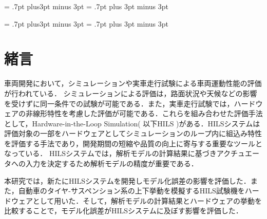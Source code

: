 \documentclass{article_vdlab_sotsuron_youshi}
\begin{document}
\kanjiskip = .7pt plus3pt minus 3pt
\xkanjiskip = .7pt plus 3pt minus 3pt
\small
{}

\setlength{\abovecaptionskip}{0mm}
\setlength{\belowcaptionskip}{0mm}
\setlength{\floatsep}{0mm}
\setlength{\textfloatsep}{0mm}
\setlength{\intextsep}{3mm}
\setlength{\dblfloatsep}{0mm}
\setlength{\dbltextfloatsep}{0mm}



\kanjiskip = .7pt plus3pt minus 3pt
\xkanjiskip = .7pt plus 3pt minus 3pt
\small
{}


\section{緒言}
車両開発において，シミュレーションや実車走行試験による車両運動性能の評価が行われている．
シミュレーションによる評価は，路面状況や天候などの影響を受けずに同一条件での試験が可能である．また，実車走行試験では，ハードウェアの非線形特性を考慮した評価が可能である．これらを組み合わせた評価手法として，Hardware-in-the-Loop Simulation( 以下HILS )がある．HILSシステムは評価対象の一部をハードウェアとしてシミュレーションのループ内に組込み特性を評価する手法であり，開発期間の短縮や品質の向上に寄与する重要なツールとなっている\cite{1}．
HILSシステムでは，解析モデルの計算結果に基づきアクチュエータへの入力を決定するため解析モデルの精度が重要である．
\par
本研究では，新たにHILSシステムを開発しモデル化誤差の影響を評価した．また，自動車のタイヤ-サスペンション系の上下挙動を模擬するHILS試験機をハードウェアとして用いた．そして，解析モデルの計算結果とハードウェアの挙動を比較することで，モデル化誤差がHILSシステムに及ぼす影響を評価した．

\vspace{1mm}
\end{document}
